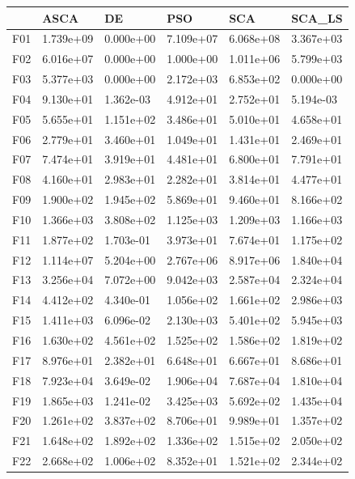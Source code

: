 \begin{tabular}{llllll}
\toprule
{} &       ASCA &         DE &        PSO &        SCA &     SCA\_LS \\
\midrule
F01  &  1.739e+09 &  0.000e+00 &  7.109e+07 &  6.068e+08 &  3.367e+03 \\
F02  &  6.016e+07 &  0.000e+00 &  1.000e+00 &  1.011e+06 &  5.799e+03 \\
F03  &  5.377e+03 &  0.000e+00 &  2.172e+03 &  6.853e+02 &  0.000e+00 \\
F04  &  9.130e+01 &  1.362e-03 &  4.912e+01 &  2.752e+01 &  5.194e-03 \\
F05  &  5.655e+01 &  1.151e+02 &  3.486e+01 &  5.010e+01 &  4.658e+01 \\
F06  &  2.779e+01 &  3.460e+01 &  1.049e+01 &  1.431e+01 &  2.469e+01 \\
F07  &  7.474e+01 &  3.919e+01 &  4.481e+01 &  6.800e+01 &  7.791e+01 \\
F08  &  4.160e+01 &  2.983e+01 &  2.282e+01 &  3.814e+01 &  4.477e+01 \\
F09  &  1.900e+02 &  1.945e+02 &  5.869e+01 &  9.460e+01 &  8.166e+02 \\
F10  &  1.366e+03 &  3.808e+02 &  1.125e+03 &  1.209e+03 &  1.166e+03 \\
F11  &  1.877e+02 &  1.703e-01 &  3.973e+01 &  7.674e+01 &  1.175e+02 \\
F12  &  1.114e+07 &  5.204e+00 &  2.767e+06 &  8.917e+06 &  1.840e+04 \\
F13  &  3.256e+04 &  7.072e+00 &  9.042e+03 &  2.587e+04 &  2.324e+04 \\
F14  &  4.412e+02 &  4.340e-01 &  1.056e+02 &  1.661e+02 &  2.986e+03 \\
F15  &  1.411e+03 &  6.096e-02 &  2.130e+03 &  5.401e+02 &  5.945e+03 \\
F16  &  1.630e+02 &  4.561e+02 &  1.525e+02 &  1.586e+02 &  1.819e+02 \\
F17  &  8.976e+01 &  2.382e+01 &  6.648e+01 &  6.667e+01 &  8.686e+01 \\
F18  &  7.923e+04 &  3.649e-02 &  1.906e+04 &  7.687e+04 &  1.810e+04 \\
F19  &  1.865e+03 &  1.241e-02 &  3.425e+03 &  5.692e+02 &  1.435e+04 \\
F20  &  1.261e+02 &  3.837e+02 &  8.706e+01 &  9.989e+01 &  1.357e+02 \\
F21  &  1.648e+02 &  1.892e+02 &  1.336e+02 &  1.515e+02 &  2.050e+02 \\
F22  &  2.668e+02 &  1.006e+02 &  8.352e+01 &  1.521e+02 &  2.344e+02 \\

\end{tabular}
